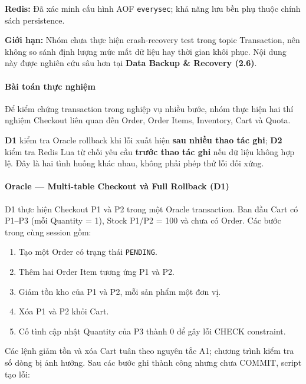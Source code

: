 \textbf{Redis:} Đã xác minh cấu hình AOF \texttt{everysec}; khả năng lưu bền phụ thuộc chính sách persistence.

\textbf{Giới hạn:} Nhóm chưa thực hiện crash-recovery test trong topic Transaction, nên không so sánh định lượng mức mất dữ liệu hay thời gian khôi phục. Nội dung này được nghiên cứu sâu hơn tại \textbf{Data Backup \& Recovery (2.6)}.

\label{sec:tx-2-5}
\paragraph*{Bài toán thực nghiệm}

Để kiểm chứng transaction trong nghiệp vụ nhiều bước, nhóm thực hiện hai thí nghiệm Checkout liên quan đến Order, Order Items, Inventory, Cart và Quota.

\textbf{D1} kiểm tra Oracle rollback khi lỗi xuất hiện \textbf{sau nhiều thao tác ghi}; \textbf{D2} kiểm tra Redis Lua từ chối yêu cầu \textbf{trước thao tác ghi} nếu dữ liệu không hợp lệ. Đây là hai tình huống khác nhau, không phải phép thử lỗi đối xứng.

\paragraph*{Oracle — Multi-table Checkout và Full Rollback (D1)}

D1 thực hiện Checkout P1 và P2 trong một Oracle transaction. Ban đầu Cart có P1–P3 (mỗi Quantity = 1), Stock P1/P2 = 100 và chưa có Order. Các bước trong cùng session gồm:

\begin{enumerate}[leftmargin=*,itemsep=2pt,topsep=4pt]
\item
Tạo một Order có trạng thái \texttt{PENDING}.

\item
Thêm hai Order Item tương ứng P1 và P2.

\item
Giảm tồn kho của P1 và P2, mỗi sản phẩm một đơn vị.

\item
Xóa P1 và P2 khỏi Cart.

\item
Cố tình cập nhật Quantity của P3 thành 0 để gây lỗi CHECK constraint.

\end{enumerate}
Các lệnh giảm tồn và xóa Cart tuân theo nguyên tắc A1; chương trình kiểm tra số dòng bị ảnh hưởng. Sau các bước ghi thành công nhưng chưa COMMIT, script tạo lỗi:

